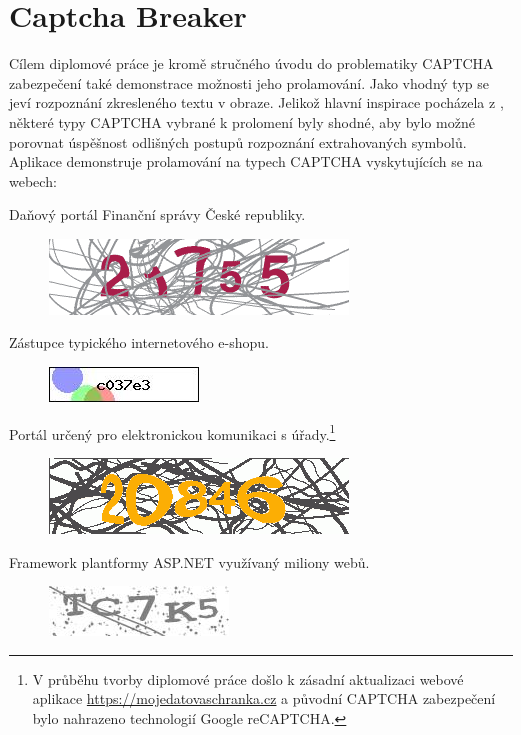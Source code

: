 \documentclass[
  field=ainfp,
  master=true,
  biblatex,
  sourcecodes=false,
  theorems=false,
  glossaries,
  index
]{kidiplom}
\begin{document}
\section{Captcha Breaker}
Cílem diplomové práce je kromě stručného úvodu do problematiky CAPTCHA zabezpečení také demonstrace možnosti jeho prolamování. Jako vhodný typ se jeví rozpoznání zkresleného textu v obraze. Jelikož hlavní inspirace pocházela z \cite{Kopp2016HowTM}, některé typy CAPTCHA vybrané k prolomení byly shodné, aby bylo možné porovnat úspěšnost odlišných postupů rozpoznání extrahovaných symbolů. Aplikace demonstruje prolamování na typech CAPTCHA vyskytujících se na webech:
\begin{description}[align=left]
\item [adiseet.mfcr.cz] Daňový portál Finanční správy České republiky.
\begin{figure}[H]
  \centering
  \includegraphics[scale=0.5]{images/eet.png}
\end{figure}

\item [kamody.cz] Zástupce typického internetového e-shopu.
\begin{figure}[H]
  \centering
  \includegraphics{images/kamody.jpg}
\end{figure}

\item [mojedatovaschranka.cz] Portál určený pro elektronickou komunikaci s úřady.\footnote{V průběhu tvorby diplomové práce došlo k zásadní aktualizaci webové aplikace \url{https://mojedatovaschranka.cz} a původní CAPTCHA zabezpečení bylo nahrazeno technologií Google reCAPTCHA.}
\begin{figure}[H]
  \centering
  \includegraphics[scale=0.5]{images/datovka.png}
\end{figure}

\item [telerik.com] Framework plantformy ASP.NET využívaný miliony webů.
\begin{figure}[H]
  \centering
  \includegraphics{images/telerik.jpg}
\end{figure}


\end{description}
\end{document}
